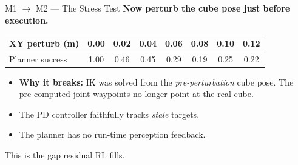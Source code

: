 \documentclass[aspectratio=169, 10pt]{beamer}
\begin{document}
\begin{frame}{M1 \(\to\) M2 --- The Stress Test}
  \textbf{Now perturb the cube pose just before execution.}

  \vspace{0.5em}
  \begin{center}
    \small
    \begin{tabular}{lccccccc}
      \toprule
      XY perturb (m) & 0.00 & 0.02 & 0.04 & 0.06 & 0.08 & 0.10 & 0.12 \\
      \midrule
      Planner success & 1.00 & 0.46 & 0.45 & 0.29 & 0.19 & 0.25 & 0.22 \\
      \bottomrule
    \end{tabular}
  \end{center}

  \vspace{0.5em}
  \begin{itemize}
    \item \textbf{Why it breaks:} IK was solved from the
          \emph{pre-perturbation} cube pose. The pre-computed joint
          waypoints no longer point at the real cube.
    \item The PD controller faithfully tracks \emph{stale} targets.
    \item The planner has no run-time perception feedback.
  \end{itemize}

  \vspace{0.5em}
  \alert{This is the gap residual RL fills.}
\end{frame}
\end{document}
